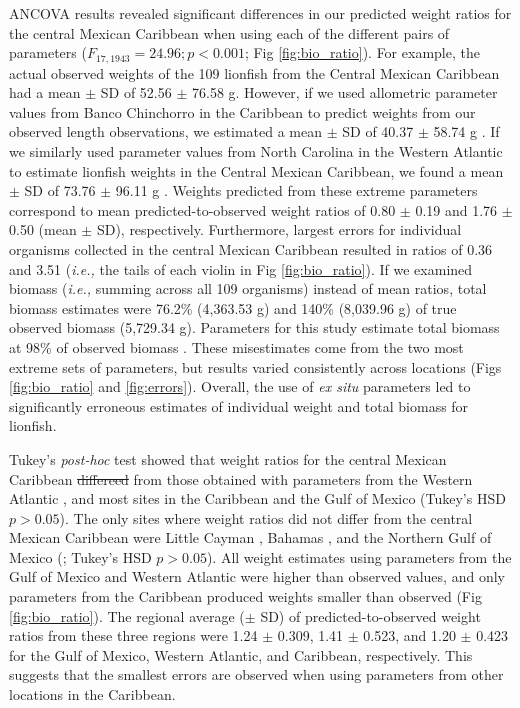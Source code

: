 \documentclass[fleqn,10pt,lineno]{wlpeerj} %
\providecommand{\DIFadd}[1]{{\protect\color{blue}\uwave{#1}}} %
\providecommand{\DIFdel}[1]{{\protect\color{red}\sout{#1}}}                      %
\providecommand{\DIFaddbegin}{} %
\providecommand{\DIFaddend}{} %
\providecommand{\DIFdelbegin}{} %
\providecommand{\DIFdelend}{} %
\begin{document}
ANCOVA results revealed significant differences in our predicted weight
ratios for the central Mexican Caribbean when using each of the
different pairs of parameters (\(F_{17, 1943} = 24.96; p < 0.001\); Fig
\ref{fig:bio_ratio}). For example, the actual observed weights of the
109 lionfish from the Central Mexican Caribbean had a mean \(\pm\) SD of
52.56 \(\pm\) 76.58 g. However, if we used allometric parameter values
from Banco Chinchorro in the Caribbean to predict weights from our
observed length observations, we estimated a mean \(\pm\) SD of 40.37
\(\pm\) 58.74 g \citep{sabidoitz_2016}. If we similarly used parameter
values from North Carolina in the Western Atlantic to estimate lionfish
weights in the Central Mexican Caribbean, we found a mean \(\pm\) SD of
73.76 \(\pm\) 96.11 g \citep{barbour_2011}. Weights predicted from these
extreme parameters correspond to mean predicted-to-observed weight
ratios of 0.80 \(\pm\) 0.19 and 1.76 \(\pm\) 0.50 (mean \(\pm\) SD),
respectively. Furthermore, largest errors for individual organisms
collected in the central Mexican Caribbean resulted in ratios of 0.36
and 3.51 (\emph{i.e.,} the tails of each violin in Fig
\ref{fig:bio_ratio}). If we examined biomass (\emph{i.e.,} summing
across all 109 organisms) instead of mean ratios, total biomass
estimates were 76.2\% (4,363.53 g) and 140\% (8,039.96 g) of true
observed biomass (5,729.34 g). Parameters for this study estimate total
biomass at 98\% of observed biomass \DIFaddbegin \DIFadd{(Fig \ref{fig:errors})}\DIFaddend . These misestimates come from the
two most extreme sets of parameters, but results varied consistently
across locations (Figs \ref{fig:bio_ratio} and \ref{fig:errors}).
Overall, the use of \emph{ex situ} parameters led to significantly
erroneous estimates of individual weight and total biomass for lionfish.

Tukey's \emph{post-hoc} test showed that weight ratios for the central
Mexican Caribbean \DIFdelbegin \DIFdel{differeed }\DIFdelend \DIFaddbegin \DIFadd{differed }\DIFaddend from those obtained with parameters from the
Western Atlantic \DIFaddbegin \DIFadd{in North Carolina \mbox{%
\citep{barbour_2011}}\hspace{0pt}%
}\DIFaddend ,
and most sites in the Caribbean and the Gulf of Mexico
(Tukey's HSD \(p > 0.05\)). The only sites where weight ratios did not
differ from the central Mexican Caribbean were Little Cayman
\citep{edwards_2014}, Bahamas \citep{darling_2011},
and the Northern Gulf of Mexico (\citet{dahl_2014}; Tukey's HSD
\(p > 0.05\)). All weight estimates using parameters from the Gulf of
Mexico and Western Atlantic were higher than observed values, and only
parameters from the Caribbean produced weights smaller than observed
(Fig \ref{fig:bio_ratio}). The regional average (\(\pm\) SD) of
predicted-to-observed weight ratios from these three regions were 1.24
\(\pm\) 0.309, 1.41 \(\pm\) 0.523, and 1.20 \(\pm\) 0.423 for the Gulf
of Mexico, Western Atlantic, and Caribbean, respectively. This suggests
that the smallest errors are observed when using parameters from other
locations in the Caribbean.
\end{document}
